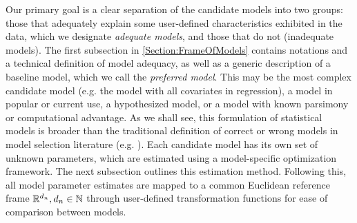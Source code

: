 

Our primary goal is a clear separation of the candidate models into two groups: those that adequately explain some user-defined characteristics exhibited in the data, which we designate {\textit{adequate models}}, and those that do not (inadequate models). The first subsection in \ref{Section:FrameOfModels} contains notations and a technical definition of model adequacy, as well as a generic description of a baseline model, which we call the \textit{preferred model}. This may be the most complex candidate model (e.g. the model with all covariates in regression), a model in popular or current use, a hypothesized model, or a model with known parsimony or computational advantage. As we shall see, this formulation of statistical models is broader than the traditional definition of correct or wrong models in model selection literature (e.g. \cite{shao93,shao96}). Each candidate model has its own set of unknown parameters, which are estimated using a model-specific optimization framework. The next subsection outlines this estimation method. Following this,  all model parameter estimates are mapped to a common Euclidean reference frame ${\mathbb{R}}^{d_n}, d_n \in {\mathbb{N}}$ through user-defined transformation functions for ease of comparison between models.

